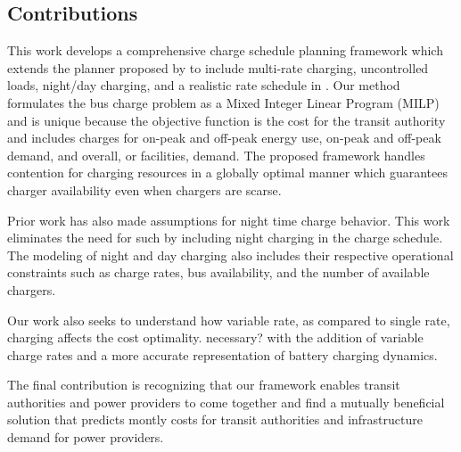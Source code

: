 \subsection{Contributions}
This work develops a comprehensive charge schedule planning framework which extends the planner proposed by \cite{whitaker_network_2021} to include multi-rate charging, uncontrolled loads, night/day charging, and a realistic rate schedule in \cite{noauthor_rocky_nodate}. Our method formulates the bus charge problem as a Mixed Integer Linear Program (MILP) and is unique because the objective function is the cost for the transit authority and includes charges for on-peak and off-peak energy use, on-peak and off-peak demand, and overall, or facilities, demand. The proposed framework handles contention for charging resources in a globally optimal manner which guarantees charger availability even when chargers are scarse.
\par Prior work has also made assumptions for night time charge behavior. This work eliminates the need for such by including night charging in the charge schedule. The modeling of night and day charging also includes their respective operational constraints such as charge rates, bus availability, and the number of available chargers.
\par Our work also seeks to understand how variable rate, as compared to single rate, charging affects the cost optimality. necessary? with the addition of variable charge rates and a more accurate representation of battery charging dynamics. 
\par The final contribution is recognizing that our framework enables transit authorities and power providers to come together and find a mutually beneficial solution that predicts montly costs for transit authorities and infrastructure demand for power providers.

